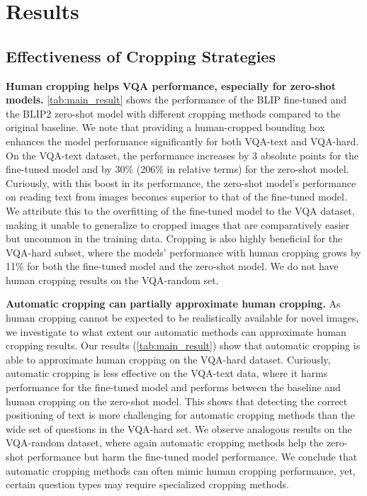 \section{Results}

\subsection{Effectiveness of Cropping Strategies}

\textbf{Human cropping helps VQA performance, especially for zero-shot models.} \autoref{tab:main_result} shows the performance of the BLIP fine-tuned and the BLIP2 zero-shot model with different cropping methods compared to the original baseline. We note that providing a human-cropped bounding box enhances the model performance significantly for both VQA-text and VQA-hard. On the VQA-text dataset, the performance increases by 3 absolute points for the fine-tuned model and by 30\% (206\% in relative terms) for the zero-shot model. Curiously, with this boost in its performance, the zero-shot model's performance on reading text from images becomes superior to that of the fine-tuned model. We attribute this to the overfitting of the fine-tuned model to the VQA dataset, making it unable to generalize to cropped images that are comparatively easier but uncommon in the training data. Cropping is also highly beneficial for the VQA-hard subset, where the models' performance with human cropping grows by 11\% for both the fine-tuned model and the zero-shot model. We do not have human cropping results on the VQA-random set.




\textbf{Automatic cropping can partially approximate human cropping.} As human cropping cannot be expected to be realistically available for novel images, we investigate to what extent our automatic methods can approximate human cropping results. Our results (\autoref{tab:main_result}) show that automatic cropping is able to approximate human cropping on the VQA-hard dataset. Curiously, automatic cropping is less effective on the VQA-text data, where it harms performance for the fine-tuned model and performs between the baseline and human cropping on the zero-shot model. This shows that detecting the correct positioning of text is more challenging for automatic cropping methods than the wide set of questions in the VQA-hard set. 
We observe analogous results on the VQA-random dataset, where again automatic cropping methods help the zero-shot performance but harm the fine-tuned model performance.
We conclude that automatic cropping methods can often mimic human cropping performance, yet, certain question types may require specialized cropping methods.

